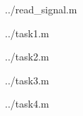 \documentclass[12pt, a4paper]{article}
\begin{document}
\newpage


    {../read_signal.m}

    {../task1.m}

    {../task2.m}

    {../task3.m}

    {../task4.m}
\end{document}
